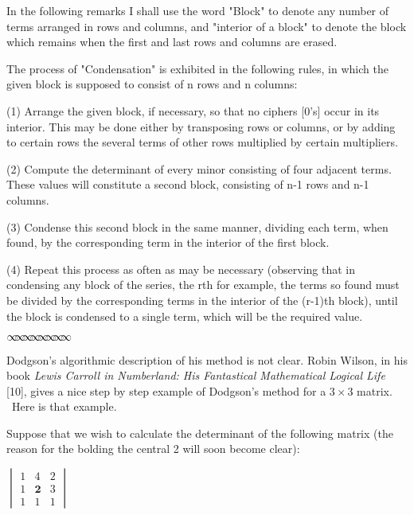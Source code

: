 \documentclass[11pt]{article}%
\theoremstyle{definition}
\newcommand{\sep}{\vspace{-3pt} \begin{center}
{\mathversion{normal}
$\infty \mspace{-5.5mu} \infty \mspace{-5.5mu}
\infty \mspace{-5.5mu} \infty \mspace{-5.5mu}
\infty \mspace{-5.5mu} \infty \mspace{-5.5mu}
\infty \mspace{-5.5mu} \infty$}
\end{center} \vspace{-3pt}}
\begin{document}
\bigskip

\textsf{In the following remarks I shall use the word "Block" to denote any
number of terms arranged in rows and columns, and "interior of a block" to
denote the block which remains when the first and last rows and columns are
erased.}

\bigskip

\textsf{The process of "Condensation" is exhibited in the following rules, in
which the given block is supposed to consist of n rows and n columns:}

\textsf{(1) Arrange the given block, if necessary, so that no ciphers [0's]
occur in its interior. This may be done either by transposing rows or columns,
or by adding to certain rows the several terms of other rows multiplied by
certain multipliers.}

\textsf{(2) Compute the determinant of every minor consisting of four adjacent
terms. These values will constitute a second block, consisting of n-1 rows and
n-1 columns.}

\textsf{(3) Condense this second block in the same manner, dividing each term,
when found, by the corresponding term in the interior of the first block.}

\textsf{(4) Repeat this process as often as may be necessary (observing that
in condensing any block of the series, the rth for example, the terms so found
must be divided by the corresponding terms in the interior of the (r-1)th
block), until the block is condensed to a single term, which will be the
required value.}%

\sep


Dodgson's algorithmic description of his method is not clear. Robin Wilson, in
his book \textit{Lewis Carroll in Numberland: His Fantastical Mathematical
Logical Life }[10], gives a nice step by step example of Dodgson's method for
a $3\times3$ matrix. \ Here is that example.

\bigskip Suppose that we wish to calculate the determinant of the following
matrix (the reason for the bolding the central 2 will soon become clear):

\begin{center}
$%
\begin{vmatrix}
1 & 4 & 2\\
1 & \mathbf{2} & 3\\
1 & 1 & 1
\end{vmatrix}
$
\end{center}
\end{document}
